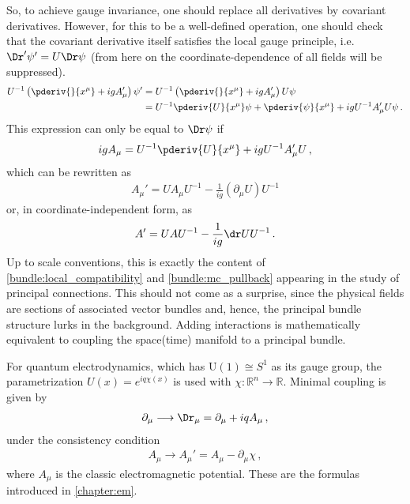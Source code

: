     So, to achieve gauge invariance, one should replace all derivatives by covariant derivatives. However, for this to be a well-defined operation, one should check that the covariant derivative itself satisfies the local gauge principle, i.e.~$\Dr'\psi'=U\Dr\psi$ (from here on the coordinate-dependence of all fields will be suppressed).
    \begin{align}
        U^{-1}\left(\pderiv{}{x^\mu} + igA_\mu'\right)\psi' &= U^{-1}\left(\pderiv{}{x^\mu} + igA_\mu'\right)U\psi\nonumber\\
        &= U^{-1}\pderiv{U}{x^\mu}\psi + \pderiv{\psi}{x^\mu} + igU^{-1}A_\mu'U\psi\,.
    \end{align}
    This expression can only be equal to $\Dr\psi$ if
    \begin{gather}
        igA_\mu = U^{-1}\pderiv{U}{x^\mu} + igU^{-1}A_\mu'U\,,
    \end{gather}
    which can be rewritten as
    \begin{gather}
        \label{gauge:gauge_transformed_connection}
        A_\mu' = UA_\mu U^{-1} - \frac{1}{ig}(\partial_\mu U)U^{-1}
    \end{gather}
    or, in coordinate-independent form, as
    \begin{gather}
        A' = UAU^{-1} - \frac{1}{ig}\dr UU^{-1}\,.
    \end{gather}
    Up to scale conventions, this is exactly the content of \cref{bundle:local_compatibility} and \cref{bundle:mc_pullback} appearing in the study of principal connections. This should not come as a surprise, since the physical fields are sections of associated vector bundles and, hence, the principal bundle structure lurks in the background. Adding interactions is mathematically equivalent to coupling the space(time) manifold to a principal bundle.

    \begin{example}[QED]
        For quantum electrodynamics, which has $\mathrm{U}(1)\cong S^1$ as its gauge group, the parametrization $U(x)=e^{iq\chi(x)}$ is used with $\chi:\mathbb{R}^n\rightarrow\mathbb{R}$. Minimal coupling is given by
        \begin{gather}
            \partial_\mu\longrightarrow\Dr_\mu = \partial_\mu + iqA_\mu\,,
        \end{gather}
        under the consistency condition
        \begin{gather}
            A_\mu\longrightarrow A_\mu' = A_\mu - \partial_\mu\chi\,,
        \end{gather}
        where $A_\mu$ is the classic electromagnetic potential. These are the formulas introduced in \cref{chapter:em}.
    \end{example}

